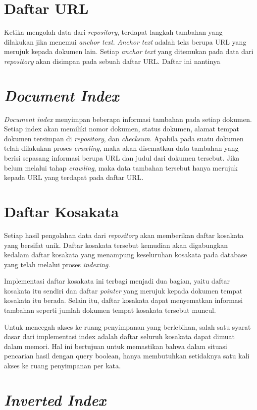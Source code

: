 \section{Daftar URL}

Ketika mengolah data dari \emph{repository}, terdapat langkah tambahan yang
dilakukan jika menemui \emph{anchor text}. \emph{Anchor text} adalah teks berupa
URL yang merujuk kepada dokumen lain. Setiap \emph{anchor text} yang ditemukan
pada data dari \emph{repository} akan disimpan pada sebuah daftar URL\@. Daftar
ini nantinya 

\section{\emph{Document Index}}
\emph{Document index} menyimpan beberapa informasi tambahan pada setiap dokumen.
Setiap index akan memiliki nomor dokumen, status dokumen, alamat tempat dokumen
tersimpan di \emph{repository}, dan \emph{checksum}. Apabila pada suatu dokumen
telah dilakukan proses \emph{crawling}, maka akan disematkan data tambahan yang
berisi sepasang informasi berupa URL dan judul dari dokumen tersebut. Jika
belum melalui tahap \emph{crawling}, maka data tambahan tersebut hanya merujuk
kepada URL yang terdapat pada daftar URL\@.

\section{Daftar Kosakata}

Setiap hasil pengolahan data dari \emph{repository} akan memberikan daftar
kosakata yang bersifat unik. Daftar kosakata tersebut kemudian akan digabungkan
kedalam daftar kosakata yang menampung keseluruhan kosakata pada database yang
telah melalui proses \emph{indexing}.

Implementasi daftar kosakata ini terbagi menjadi dua bagian, yaitu daftar
kosakata itu sendiri dan daftar \emph{pointer} yang merujuk kepada dokumen
tempat kosakata itu berada. Selain itu, daftar kosakata dapat menyematkan
informasi tambahan seperti jumlah dokumen tempat kosakata tersebut muncul.

Untuk mencegah akses ke ruang penyimpanan yang berlebihan, salah satu syarat
dasar dari implementasi index adalah daftar seluruh kosakata dapat dimuat dalam
memori. Hal ini bertujuan untuk memastikan bahwa dalam situasi pencarian hasil
dengan query boolean, hanya membutuhkan setidaknya satu kali akses ke ruang
penyimpanan per kata.

\section{\emph{Inverted Index}}

